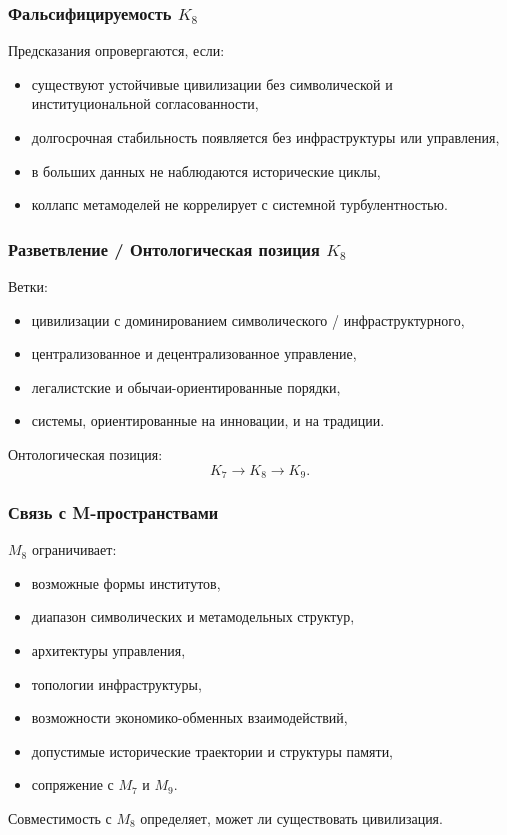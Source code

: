 \subsubsection{Фальсифицируемость \texorpdfstring{$K_8$}{K_8}}

Предсказания опровергаются, если:
\begin{itemize}
    \item существуют устойчивые цивилизации без символической и институциональной согласованности,
    \item долгосрочная стабильность появляется без инфраструктуры или управления,
    \item в больших данных не наблюдаются исторические циклы,
    \item коллапс метамоделей не коррелирует с системной турбулентностью.
\end{itemize}

\subsubsection{Разветвление / Онтологическая позиция \texorpdfstring{$K_8$}{K_8}}

Ветки:
\begin{itemize}
    \item цивилизации с доминированием символического / инфраструктурного,
    \item централизованное и децентрализованное управление,
    \item легалистские и обычаи-ориентированные порядки,
    \item системы, ориентированные на инновации, и на традиции.
\end{itemize}

Онтологическая позиция:
\[
K_7 \to K_8 \to K_9.
\]

\subsubsection{Связь с M-пространствами}

$M_8$ ограничивает:
\begin{itemize}
    \item возможные формы институтов,
    \item диапазон символических и метамодельных структур,
    \item архитектуры управления,
    \item топологии инфраструктуры,
    \item возможности экономико-обменных взаимодействий,
    \item допустимые исторические траектории и структуры памяти,
    \item сопряжение с $M_7$ и $M_9$.
\end{itemize}

Совместимость с $M_8$ определяет, может ли существовать цивилизация.
